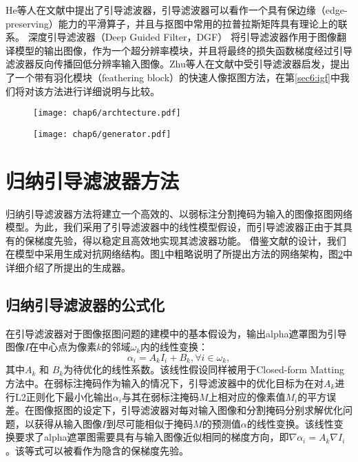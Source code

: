 He等人在文献\parencite{he2010guided}中提出了引导滤波器，引导滤波器可以看作一个具有保边缘（edge-preserving）能力的平滑算子，并且与抠图中常用的拉普拉斯矩阵具有理论上的联系。
深度引导滤波器（Deep Guided Filter，DGF）\cite{wu2018fast} 将引导滤波器作用于图像翻译模型的输出图像，作为一个超分辨率模块，并且将最终的损失函数梯度经过引导滤波器反向传播回低分辨率输入图像。Zhu等人在文献\parencite{zhu2017fast}中受引导滤波器启发，提出了一个带有羽化模块（feathering block）的快速人像抠图方法，在第\ref{sec6:igf}中我们将对该方法进行详细说明与比较。

\begin{figure}[t]
	\centering
	\texttt{[image: chap6/archtecture.pdf]}
	\label{fig6:archtecture}
\end{figure}
\begin{figure}[t]
	\centering
	\texttt{[image: chap6/generator.pdf]}
	\label{fig6:generator}
\end{figure}

\section{归纳引导滤波器方法}
归纳引导滤波器方法将建立一个高效的、以弱标注分割掩码为输入的图像抠图网络模型。为此，我们采用了引导滤波器\cite{he2010guided}中的线性模型假设，而引导滤波器正由于其具有的保梯度先验，得以稳定且高效地实现其滤波器功能。
借鉴文献\parencite{lutz2018alphagan}的设计，我们在模型中采用生成对抗网络\cite{goodfellow2014generative}结构。图\ref{fig6:archtecture}中粗略说明了所提出方法的网络架构，图\ref{fig6:generator}中详细介绍了所提出的生成器。

\subsection{归纳引导滤波器的公式化}
\label{{sec6:igf}}
在引导滤波器\cite{he2010guided}对于图像抠图问题的建模中的基本假设为，输出alpha遮罩图为引导图像$I$在中心点为像素$k$的邻域$\omega_k$内的线性变换：
\begin{equation}
\alpha_i = A_{k}I_{i} + B_{k}, \forall i \in \omega_k,
\end{equation}
其中$ A_{k} $ 和 $ B_{k} $为待优化的线性系数。该线性假设同样被用于Closed-form Matting\cite{levin2008closed}方法中。在弱标注掩码作为输入的情况下，引导滤波器中的优化目标为在对$A_{k}$进行L2正则化下最小化输出$\alpha_i$与其在弱标注掩码$ M $上相对应的像素值$M_i$的平方误差。在图像抠图的设定下，引导滤波器对每对输入图像和分割掩码分别求解优化问题，以获得从输入图像$I$到尽可能相似于掩码$M$的预测值$\alpha$的线性变换。该线性变换要求了alpha遮罩图需要具有与输入图像近似相同的梯度方向，即$ \nabla \alpha_i=A_k \nabla I_i $。该等式可以被看作为隐含的保梯度先验。

